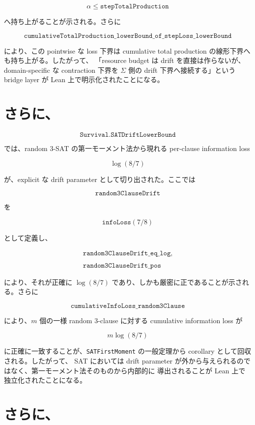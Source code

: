 \documentclass[12pt,a4paper]{article}
\begin{document}
\[
\alpha \le \texttt{stepTotalProduction}
\]

へ持ち上がることが示される。さらに

\[
\texttt{cumulativeTotalProduction\_lowerBound\_of\_stepLoss\_lowerBound}
\]

により、この pointwise な loss 下界は cumulative total production の線形下界へも持ち上がる。したがって、 「resource budget は drift を直接は作らないが、domain-specific な contraction 下界を \(\Sigma\) 側の drift 下界へ接続する」という bridge layer が Lean 上で明示化されたことになる。

\section{さらに、}\label{ux3055ux3089ux306b-11}

\[
\texttt{Survival.SATDriftLowerBound}
\]

では、random 3-SAT の第一モーメント法から現れる per-clause information loss

\[
\log(8/7)
\]

が、explicit な drift parameter として切り出された。ここでは

\[
\texttt{random3ClauseDrift}
\]

を

\[
\texttt{infoLoss}(7/8)
\]

として定義し、

\[
\begin{aligned}
\texttt{random3ClauseDrift\_eq\_log}, \\
\qquad \\
\texttt{random3ClauseDrift\_pos}
\end{aligned}
\]

により、それが正確に \(\log(8/7)\) であり、しかも厳密に正であることが示される。さらに

\[
\texttt{cumulativeInfoLoss\_random3Clause}
\]

により、\(m\) 個の一様 random 3-clause に対する cumulative information loss が

\[
m \log(8/7)
\]

に正確に一致することが、\texttt{SATFirstMoment} の一般定理から corollary として回収される。したがって、 SAT においては drift parameter が外から与えられるのではなく、第一モーメント法そのものから内部的に 導出されることが Lean 上で独立化されたことになる。

\section{さらに、}\label{ux3055ux3089ux306b-12}
\end{document}
